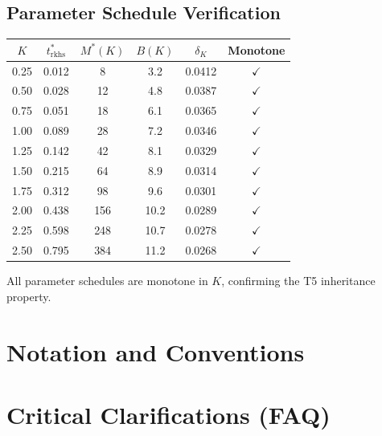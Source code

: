 \subsection{Parameter Schedule Verification}

\begin{center}
\small
\begin{tabular}{cccccc}
\toprule
$K$ & $t^*_{\mathrm{rkhs}}$ & $M^*(K)$ & $B(K)$ & $\delta_K$ & Monotone \\
\midrule
0.25 & 0.012 & 8 & 3.2 & 0.0412 & $\checkmark$ \\
0.50 & 0.028 & 12 & 4.8 & 0.0387 & $\checkmark$ \\
0.75 & 0.051 & 18 & 6.1 & 0.0365 & $\checkmark$ \\
1.00 & 0.089 & 28 & 7.2 & 0.0346 & $\checkmark$ \\
1.25 & 0.142 & 42 & 8.1 & 0.0329 & $\checkmark$ \\
1.50 & 0.215 & 64 & 8.9 & 0.0314 & $\checkmark$ \\
1.75 & 0.312 & 98 & 9.6 & 0.0301 & $\checkmark$ \\
2.00 & 0.438 & 156 & 10.2 & 0.0289 & $\checkmark$ \\
2.25 & 0.598 & 248 & 10.7 & 0.0278 & $\checkmark$ \\
2.50 & 0.795 & 384 & 11.2 & 0.0268 & $\checkmark$ \\
\bottomrule
\end{tabular}
\end{center}

All parameter schedules are monotone in $K$, confirming the T5 inheritance property.

\appendix

\section{Notation and Conventions}\label{app:notation}


\section{Critical Clarifications (FAQ)}\label{app:faq}


